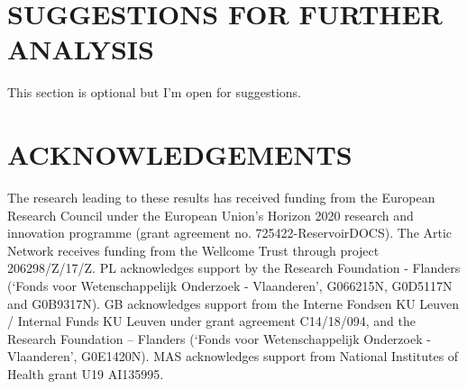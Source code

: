 \documentclass{article}
\begin{document}
\begin{multicols}{2}
\section*{SUGGESTIONS FOR FURTHER ANALYSIS}

This section is optional but I'm open for suggestions. %



\section*{ACKNOWLEDGEMENTS}

The research leading to these results has received funding from the European Research Council under the European Union's Horizon 2020 research and innovation programme (grant agreement no. 725422-ReservoirDOCS).
The Artic Network receives funding from the Wellcome Trust through project 206298/Z/17/Z.
PL acknowledges support by the Research Foundation - Flanders (‘Fonds voor Wetenschappelijk Onderzoek - Vlaanderen’, G066215N, G0D5117N and G0B9317N).
GB acknowledges support from the Interne Fondsen KU Leuven / Internal Funds KU Leuven under grant agreement C14/18/094, and the Research Foundation -- Flanders (‘Fonds voor Wetenschappelijk Onderzoek - Vlaanderen’, G0E1420N).
MAS acknowledges support from National Institutes of Health grant U19 AI135995.






\end{multicols}
\end{document}
